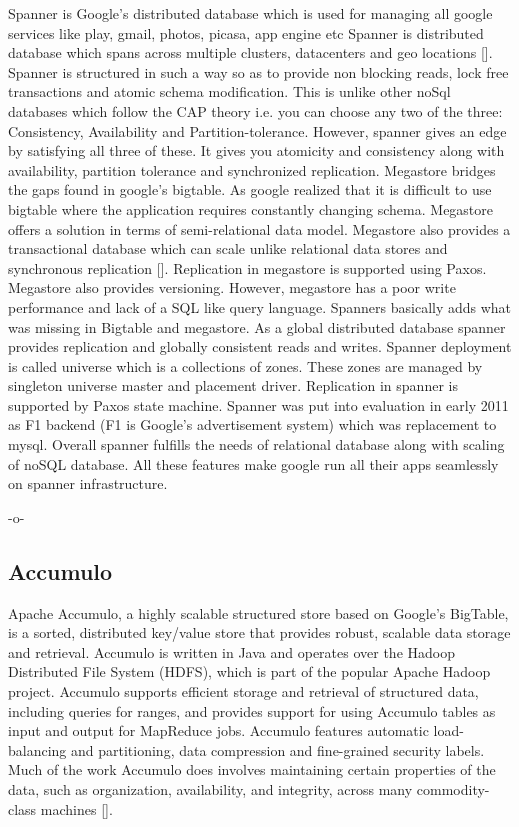Spanner is Google's distributed database which is used for managing
all google services like play, gmail, photos, picasa, app engine etc
Spanner is distributed database which spans across multiple clusters,
datacenters and geo locations [\cite{corbett-spanner}].  Spanner is
structured in such a way so as to provide non blocking reads, lock
free transactions and atomic schema modification. This is unlike other
noSql databases which follow the CAP theory i.e. you can choose any
two of the three: Consistency, Availability and
Partition-tolerance. However, spanner gives an edge by satisfying all
three of these. It gives you atomicity and consistency along with
availability, partition tolerance and synchronized replication.
Megastore bridges the gaps found in google's bigtable. As google
realized that it is difficult to use bigtable where the application
requires constantly changing schema. Megastore offers a solution in
terms of semi-relational data model.  Megastore also provides a
transactional database which can scale unlike relational data stores
and synchronous replication [\cite{www-magastore-spanner}].  Replication
in megastore is supported using Paxos. Megastore also provides
versioning. However, megastore has a poor write performance and lack
of a SQL like query language. Spanners basically adds what was missing
in Bigtable and megastore. As a global distributed database spanner
provides replication and globally consistent reads and writes. Spanner
deployment is called universe which is a collections of zones. These
zones are managed by singleton universe master and placement
driver. Replication in spanner is supported by Paxos state
machine. Spanner was put into evaluation in early 2011 as F1 backend
(F1 is Google's advertisement system) which was replacement to
mysql. Overall spanner fulfills the needs of relational database along
with scaling of noSQL database.  All these features make google run
all their apps seamlessly on spanner infrastructure.

     -o-

\subsection{Accumulo}

Apache Accumulo, a highly scalable structured store based on Google's
BigTable, is a sorted, distributed key/value store that provides
robust, scalable data storage and retrieval. Accumulo is written in
Java and operates over the Hadoop Distributed File System (HDFS),
which is part of the popular Apache Hadoop project. Accumulo supports
efficient storage and retrieval of structured data, including queries
for ranges, and provides support for using Accumulo tables as input
and output for MapReduce jobs.  Accumulo features automatic
load-balancing and partitioning, data compression and fine-grained
security labels. Much of the work Accumulo does involves maintaining
certain properties of the data, such as organization, availability,
and integrity, across many commodity-class
machines [\cite{apache-accumulo}].

